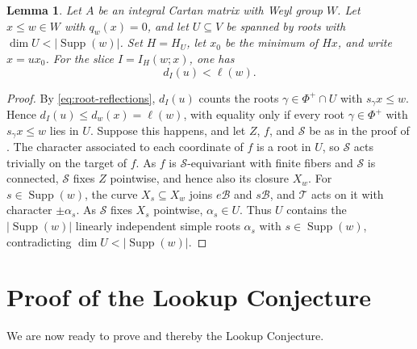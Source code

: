 \documentclass[11pt]{amsart}
\newtheorem{lemma}[lemma]{Lemma}
\theoremstyle{definition}
\theoremstyle{remark}
\numberwithin{equation}{section}
\DeclareMathOperator{\supp}{Supp}
\begin{document}
\begin{lemma}\label{lem:strict-length}
Let $A$ be an integral Cartan matrix with Weyl group $W$. Let $x\le w \in W$
with $q_w(x)=0$, and let $U\subseteq V$ be spanned by roots
with $\dim U<\lvert\supp(w)\rvert$. Set $H=H_U$, let $x_0$ be the minimum
of $Hx$, and write $x=ux_0$. For the slice
$I=I_H(w;x)$, one has
\[
 d_I(u)<\ell(w).
\]
\end{lemma}
\begin{proof}
By \eqref{eq:root-reflections}, $d_I(u)$ counts the roots
$\gamma\in\Phi^+\cap U$ with $s_\gamma x\le w$. Hence
$d_I(u)\le d_w(x)=\ell(w)$, with equality only if every root
$\gamma\in\Phi^+$ with $s_\gamma x\le w$ lies in $U$. Suppose this
happens, and let $Z$, $f$, and $\mathcal S$ be as in the proof of
. The character associated to each coordinate of $f$
is a root in $U$,
so $\mathcal S$ acts trivially on the target of $f$. As $f$ is
$\mathcal S$-equivariant with finite fibers and $\mathcal S$ is
connected, $\mathcal S$ fixes $Z$ pointwise, and hence also its
closure $X_w$. For $s\in\supp(w)$, the curve
$X_s\subseteq X_w$ joins $e\mathcal B$ and $s\mathcal B$, and
$\mathcal T$ acts on it with character $\pm\alpha_s$. As
$\mathcal S$ fixes $X_s$ pointwise, $\alpha_s\in U$. Thus $U$
contains the $\lvert\supp(w)\rvert$ linearly independent simple roots
$\alpha_s$ with $s\in\supp(w)$, contradicting
$\dim U<\lvert\supp(w)\rvert$.
\end{proof}


\section{Proof of the Lookup Conjecture}\label{sec:reduction}

We are now ready to prove  and thereby the Lookup Conjecture.
\end{document}
